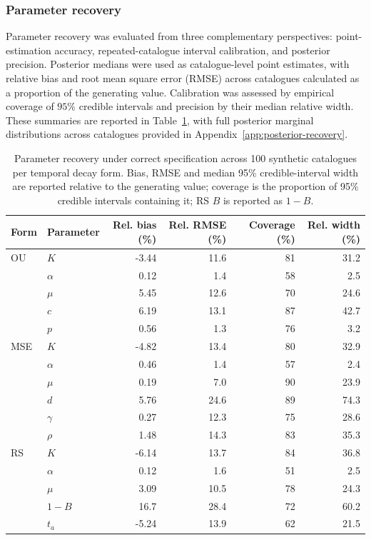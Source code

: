 \documentclass{statsmsc}
\begin{document}
\subsubsection{Parameter recovery}

Parameter recovery was evaluated from three complementary perspectives: point-estimation accuracy, repeated-catalogue interval calibration, and posterior precision. Posterior medians were used as catalogue-level point estimates, with relative bias and root mean square error (RMSE) across catalogues calculated as a proportion of the generating value. Calibration was assessed by empirical coverage of $95\%$ credible intervals and precision by their median relative width. These summaries are reported in Table~\ref{tab:simulation-recovery}, with full posterior marginal distributions across catalogues provided in Appendix~\ref{app:posterior-recovery}.
\begin{table}[htbp]
\centering
\caption{Parameter recovery under correct specification across 100
synthetic catalogues per temporal decay form. Bias, RMSE and median 95\% credible-interval width are reported relative to the generating value; coverage is the proportion of 95\% credible intervals containing it; RS $B$
is reported as $1-B$.}
\label{tab:simulation-recovery}
\small
\begin{tabular}{llrrrr}
\hline
Form & Parameter & Rel. bias (\%) & Rel. RMSE (\%) &
Coverage (\%) & Rel. width (\%) \\
\hline
OU  & $K$      & -3.44 & 11.6 & 81 & 31.2 \\
    & $\alpha$ &  0.12 &  1.4 & 58 &  2.5 \\
    & $\mu$    &  5.45 & 12.6 & 70 & 24.6 \\
    & $c$      &  6.19 & 13.1 & 87 & 42.7 \\
    & $p$      &  0.56 &  1.3 & 76 &  3.2 \\
\hline
MSE & $K$      & -4.82 & 13.4 & 80 & 32.9 \\
    & $\alpha$ &  0.46 &  1.4 & 57 &  2.4 \\
    & $\mu$    &  0.19 &  7.0 & 90 & 23.9 \\
    & $d$      &  5.76 & 24.6 & 89 & 74.3 \\
    & $\gamma$ &  0.27 & 12.3 & 75 & 28.6 \\
    & $\rho$   &  1.48 & 14.3 & 83 & 35.3 \\
\hline
RS  & $K$      & -6.14 & 13.7 & 84 & 36.8 \\
    & $\alpha$ &  0.12 &  1.6 & 51 &  2.5 \\
    & $\mu$    &  3.09 &  10.5 & 78 & 24.3 \\
    & $1-B$    & 16.7  & 28.4 & 72 & 60.2 \\
    & $t_a$    & -5.24 & 13.9 & 62 & 21.5 \\
\hline
\end{tabular}
\end{table}
\end{document}
